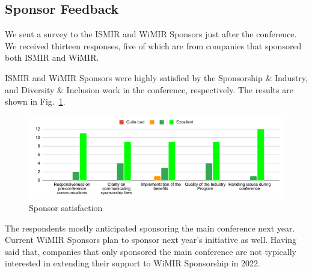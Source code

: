 \documentclass[%
10pt,								%
]
{scrartcl}
\begin{document}
    \subsection{Sponsor Feedback}   
        We sent a survey to the ISMIR and WiMIR Sponsors just after the conference. We received thirteen responses, five of which are from companies that sponsored both ISMIR and WiMIR. 

        ISMIR and WiMIR Sponsors were highly satisfied by the Sponsorship \& Industry, and Diversity \& Inclusion work in the conference, respectively. The results are shown in Fig.~\ref{fig:sponsorship_feedback}.
        \begin{figure}%
            \includegraphics[width=\columnwidth]{fig/sponsorship_feedback}%
            \caption{Sponsor satisfaction}%
            \label{fig:sponsorship_feedback}%
        \end{figure}
        
        The respondents mostly anticipated sponsoring the main conference next year. Current WiMIR Sponsors plan to sponsor next year’s initiative as well. Having said that, companies that only sponsored the main conference are not typically interested in extending their support to WiMIR Sponsorship in 2022.
        
\end{document}
